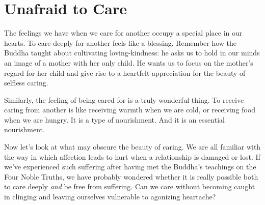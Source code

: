 

\chapter{Unafraid to Care}


The feelings we have when we care for another occupy a special place in
our hearts. To care deeply for another feels like a blessing. Remember
how the Buddha taught about cultivating loving-kindness: he asks us to
hold in our minds an image of a mother with her only child. He wants us
to focus on the mother’s regard for her child and give rise to a
heartfelt appreciation for the beauty of selfless caring.

Similarly, the feeling of being cared for is a truly wonderful thing. To
receive caring from another is like receiving warmth when we are cold,
or receiving food when we are hungry. It is a type of nourishment. And
it is an essential nourishment.

Now let’s look at what may obscure the beauty of caring. We are all
familiar with the way in which affection leads to hurt when a
relationship is damaged or lost. If we’ve experienced such suffering
after having met the Buddha’s teachings on the Four Noble
Truths,\cite{four-noble-truths}
we have probably wondered whether it is really possible both to care deeply
\emph{and} be free from suffering. Can we care without becoming caught in
clinging and leaving ourselves vulnerable to agonizing heartache?

